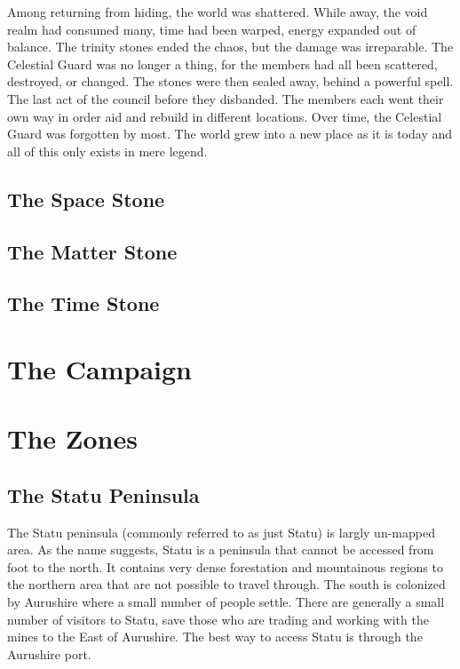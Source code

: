 \documentclass[letterpaper,10pt,twoside,twocolumn,openany]{book}
\begin{document}
Among returning from hiding, the world was shattered. While away, the void realm had consumed many, time had been warped, energy expanded out of balance. The trinity stones ended the chaos, but the damage was irreparable. The Celestial Guard was no longer a thing, for the members had all been scattered, destroyed, or changed. The stones were then sealed away, behind a powerful spell. The last act of the council before they disbanded. The members each went their own way in order aid and rebuild in different locations. Over time, the Celestial Guard was forgotten by most. The world grew into a new place as it is today and all of this only exists in mere legend.  

\section{The Space Stone}



\section{The Matter Stone}



\section{The Time Stone}



\chapter{The Campaign}



\chapter{The Zones}

\section{The Statu Peninsula}

The Statu peninsula (commonly referred to as just Statu) is largly un-mapped area. As the name suggests, Statu is a peninsula that cannot be accessed from foot to the north. It contains very dense forestation and mountainous regions to the northern area that are not possible to travel through. The south is colonized by Aurushire where a small number of people settle. There are generally a small number of visitors to Statu, save those who are trading and working with the mines to the East of Aurushire. The best way to access Statu is through the Aurushire port.
\end{document}

